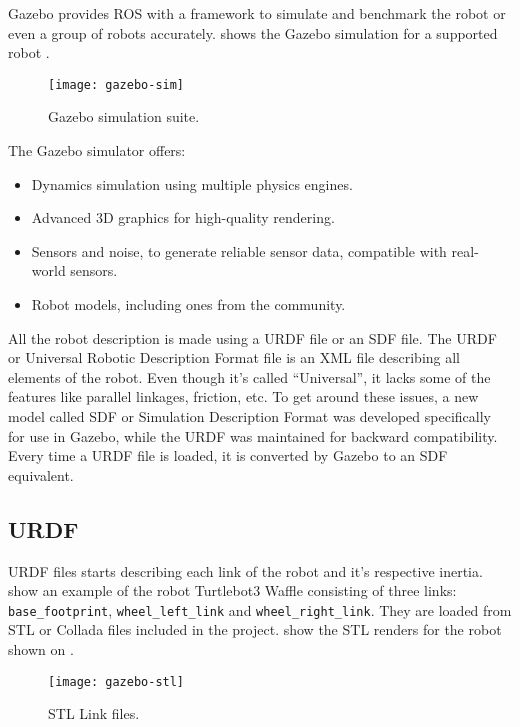 Gazebo provides ROS with a framework to simulate and benchmark the robot or even a group of robots accurately.  shows the Gazebo simulation for a supported robot \cite{koenig2004design}.

\begin{figure}[!ht]
\centering
\texttt{[image: gazebo-sim]}
\caption{Gazebo simulation suite.}
\label{fig:gazebo-sim}
\end{figure}

The Gazebo simulator offers:

\begin{itemize}
\item Dynamics simulation using multiple physics engines.
\item Advanced 3D graphics for high-quality rendering.
\item Sensors and noise, to generate reliable sensor data, compatible with real-world sensors.
\item Robot models, including ones from the community.
\end{itemize}

All the robot description is made using a URDF file or an SDF file. The URDF or Universal Robotic Description Format file is an XML file describing all elements of the robot. Even though it's called ``Universal'', it lacks some of the features like parallel linkages, friction, etc. To get around these issues, a new model called SDF or  Simulation Description Format was developed specifically for use in Gazebo, while the URDF was maintained for backward compatibility. Every time a URDF file is loaded, it is converted by Gazebo to an SDF equivalent.

\subsection{URDF}

URDF files starts describing each link of the robot and it's respective inertia.  show an example of the robot Turtlebot3 Waffle \cite{turtlebot3} consisting of three links: \texttt{base\_footprint}, \texttt{wheel\_left\_link} and \texttt{wheel\_right\_link}. They are loaded from STL or Collada files included in the project.  show the STL renders for the robot shown on .

\begin{figure}[!ht]
\centering
\texttt{[image: gazebo-stl]}
\caption{STL Link files.}
\label{fig:gazebo-stl}
\end{figure}

